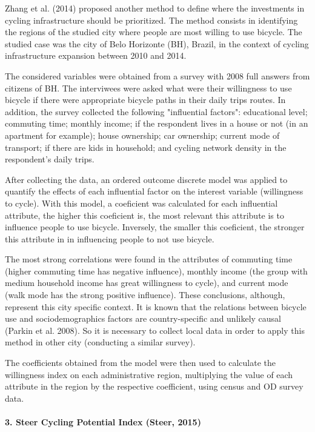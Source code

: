 \documentclass[a4paper]{article}
\begin{document}
Zhang et al. (2014) proposed another method to define where the investments in cycling infrastructure should be prioritized. The method consists in identifying the regions of the studied city where people are most willing to use bicycle. The studied case was the city of Belo Horizonte (BH), Brazil, in the context of cycling infrastructure expansion between 2010 and 2014.

The considered variables were obtained from a survey with 2008 full answers from citizens of BH. The interviwees were asked what were their willingness to use bicycle if there were appropriate bicycle paths in their daily trips routes. In addition, the survey collected the following "influential factors": educational level; commuting time; monthly income; if the respondent lives in a house or not (in an apartment for example); house ownership; car ownership; current mode of transport; if there are kids in household; and cycling network density in the respondent's daily trips.

After collecting the data, an ordered outcome discrete model was applied to quantify the effects of each influential factor on the interest variable (willingness to cycle). With this model, a coeficient was calculated for each influential attribute, the higher this coeficient is, the most relevant this attribute is to influence people to use bicycle. Inversely, the smaller this coeficient, the stronger this attribute in in influencing people to not use bicycle.

The most strong correlations were found in the attributes of commuting time (higher commuting time has negative influence), monthly income (the group with medium household income has great willingness to cycle), and current mode (walk mode has the strong positive influence). These conclusions, although, represent this city specific context. It is known that the relations between bicycle use and sociodemographics factors are country-specific and unlikely causal (Parkin et al. 2008). So it is necessary to collect local data in order to apply this method in other city  (conducting a similar survey).

The coefficients obtained from the model were then used to calculate the willingness index on each administrative region, multiplying the value of each attribute in the region by the respective coefficient, using census and OD survey data.

\paragraph{3. Steer Cycling Potential Index (Steer, 2015) }
\end{document}
